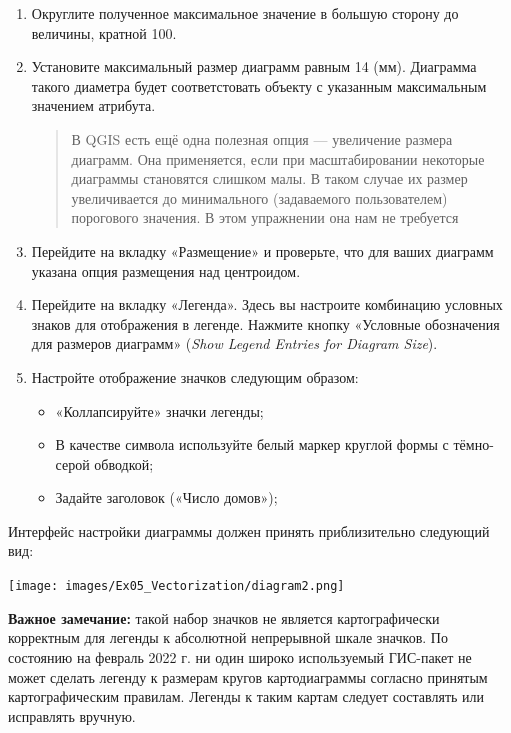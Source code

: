 \documentclass[
  12pt,
]{book}
\providecommand{\tightlist}{%
  \setlength{\itemsep}{0pt}\setlength{\parskip}{0pt}}
\begin{document}
\begin{enumerate}
\def\labelenumi{\arabic{enumi}.}
\setcounter{enumi}{5}
\item
  Округлите полученное максимальное значение в большую сторону до величины, кратной 100.
\item
  Установите максимальный размер диаграмм равным 14 (мм). Диаграмма такого диаметра будет соответстовать объекту с указанным максимальным значением атрибута.

  \begin{quote}
  В QGIS есть ещё одна полезная опция --- увеличение размера диаграмм. Она применяется, если при масштабировании некоторые диаграммы становятся слишком малы. В таком случае их размер увеличивается до минимального (задаваемого пользователем) порогового значения. В этом упражнении она нам не требуется
  \end{quote}
\item
  Перейдите на вкладку «Размещение» и проверьте, что для ваших диаграмм указана опция размещения над центроидом.
\item
  Перейдите на вкладку «Легенда». Здесь вы настроите комбинацию условных знаков для отображения в легенде. Нажмите кнопку «Условные обозначения для размеров диаграмм» (\emph{Show Legend Entries for Diagram Size}).
\item
  Настройте отображение значков следующим образом:

  \begin{itemize}
  \tightlist
  \item
    «Коллапсируйте» значки легенды;
  \item
    В качестве символа используйте белый маркер круглой формы с тёмно-серой обводкой;
  \item
    Задайте заголовок («Число домов»);
  \end{itemize}
\end{enumerate}

Интерфейс настройки диаграммы должен принять приблизительно следующий вид:

\texttt{[image: images/Ex05\_Vectorization/diagram2.png]}

\textbf{Важное замечание:} такой набор значков не является картографически корректным для легенды к абсолютной непрерывной шкале значков. По состоянию на февраль 2022 г. ни один широко используемый ГИС-пакет не может сделать легенду к размерам кругов картодиаграммы согласно принятым картографическим правилам. Легенды к таким картам следует составлять или исправлять вручную.
\end{document}
